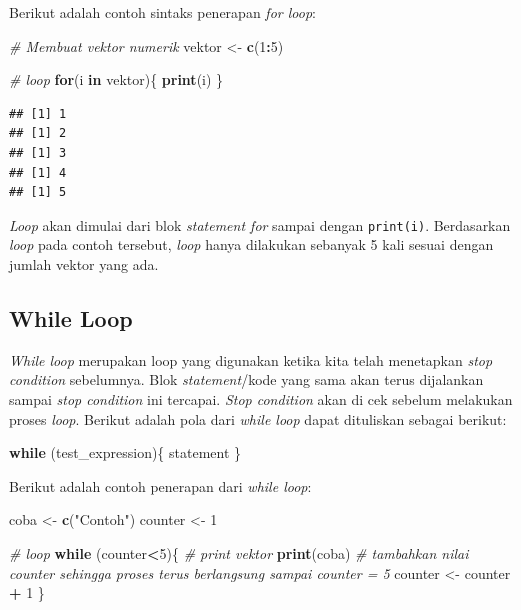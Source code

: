 \documentclass[]{book}
\newenvironment{Shaded}{\begin{snugshade}}{\end{snugshade}}
\newcommand{\CommentTok}[1]{\textcolor[rgb]{0.56,0.35,0.01}{\textit{#1}}}
\newcommand{\ControlFlowTok}[1]{\textcolor[rgb]{0.13,0.29,0.53}{\textbf{#1}}}
\newcommand{\DecValTok}[1]{\textcolor[rgb]{0.00,0.00,0.81}{#1}}
\newcommand{\KeywordTok}[1]{\textcolor[rgb]{0.13,0.29,0.53}{\textbf{#1}}}
\newcommand{\NormalTok}[1]{#1}
\newcommand{\OperatorTok}[1]{\textcolor[rgb]{0.81,0.36,0.00}{\textbf{#1}}}
\newcommand{\StringTok}[1]{\textcolor[rgb]{0.31,0.60,0.02}{#1}}
\theoremstyle{definition}
\theoremstyle{definition}
\theoremstyle{definition}
\theoremstyle{remark}
\begin{document}
Berikut adalah contoh sintaks penerapan \emph{for loop}:

\begin{Shaded}
\begin{Highlighting}[]
\CommentTok{# Membuat vektor numerik}
\NormalTok{vektor <-}\StringTok{ }\KeywordTok{c}\NormalTok{(}\DecValTok{1}\OperatorTok{:}\DecValTok{5}\NormalTok{)}

\CommentTok{# loop }
\ControlFlowTok{for}\NormalTok{(i }\ControlFlowTok{in}\NormalTok{ vektor)\{}
  \KeywordTok{print}\NormalTok{(i)}
\NormalTok{\}}
\end{Highlighting}
\end{Shaded}

\begin{verbatim}
## [1] 1
## [1] 2
## [1] 3
## [1] 4
## [1] 5
\end{verbatim}

\emph{Loop} akan dimulai dari blok \emph{statement for} sampai dengan \texttt{print(i)}. Berdasarkan \emph{loop} pada contoh tersebut, \emph{loop} hanya dilakukan sebanyak 5 kali sesuai dengan jumlah vektor yang ada.

\hypertarget{whileloop}{%
\subsection{While Loop}\label{whileloop}}

\emph{While loop} merupakan loop yang digunakan ketika kita telah menetapkan \emph{stop condition} sebelumnya. Blok \emph{statement}/kode yang sama akan terus dijalankan sampai \emph{stop condition} ini tercapai. \emph{Stop condition} akan di cek sebelum melakukan proses \emph{loop}. Berikut adalah pola dari \emph{while loop} dapat dituliskan sebagai berikut:

\begin{Shaded}
\begin{Highlighting}[]
\ControlFlowTok{while}\NormalTok{ (test_expression)\{}
\NormalTok{  statement}
\NormalTok{\}}
\end{Highlighting}
\end{Shaded}

Berikut adalah contoh penerapan dari \emph{while loop}:

\begin{Shaded}
\begin{Highlighting}[]
\NormalTok{coba <-}\StringTok{ }\KeywordTok{c}\NormalTok{(}\StringTok{"Contoh"}\NormalTok{)}
\NormalTok{counter <-}\StringTok{ }\DecValTok{1}

\CommentTok{# loop}
\ControlFlowTok{while}\NormalTok{ (counter}\OperatorTok{<}\DecValTok{5}\NormalTok{)\{}
  \CommentTok{# print vektor}
  \KeywordTok{print}\NormalTok{(coba)}
  \CommentTok{# tambahkan nilai counter sehingga proses terus berlangsung sampai counter = 5 }
\NormalTok{  counter <-}\StringTok{ }\NormalTok{counter }\OperatorTok{+}\StringTok{ }\DecValTok{1}
\NormalTok{\}}
\end{Highlighting}
\end{Shaded}
\end{document}
